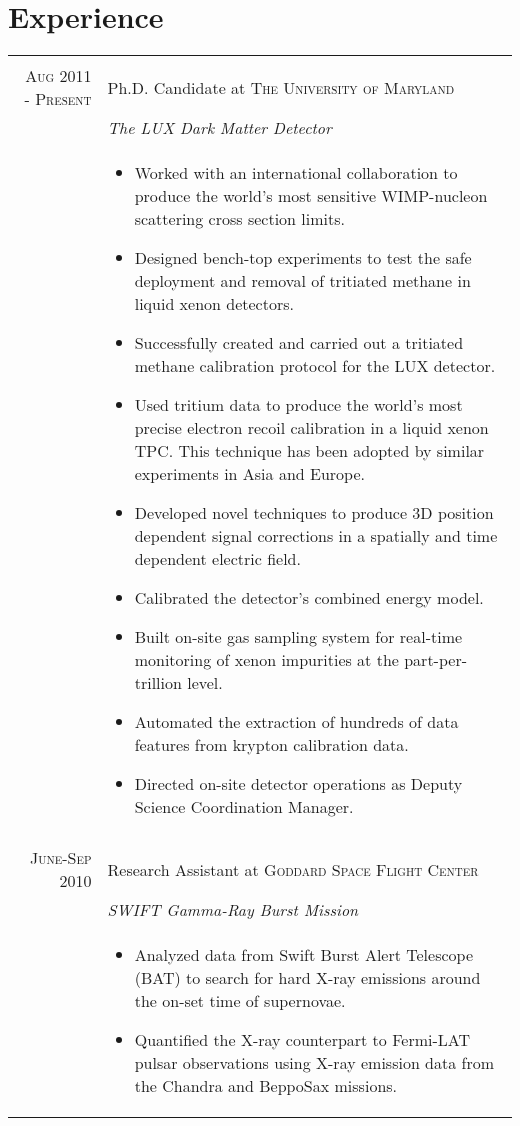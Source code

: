 \documentclass[a4paper,10pt]{article}
\begin{document}
\section{Experience}
\begin{tabular}{r|p{11cm}}
 \multicolumn{2}{c}{} \\
 \textsc{Aug 2011 - Present} & Ph.D. Candidate at \textsc{The University of Maryland} \\&\emph{The LUX Dark Matter Detector}\\&\footnotesize{
 \begin{itemize}
 
 \item Worked with an international collaboration to produce the world's most sensitive WIMP-nucleon scattering cross section limits.  
 
\item Designed bench-top experiments to test the safe deployment and removal of tritiated methane in liquid xenon detectors.  

\item Successfully created and carried out a tritiated methane calibration protocol for the LUX detector.  

\item Used tritium data to produce the world's most precise electron recoil calibration in a liquid xenon TPC.  This technique has been adopted by similar experiments in Asia and Europe. 

\item Developed novel techniques to produce 3D position dependent signal corrections in a spatially and time dependent electric field.  

\item Calibrated the detector's combined energy model.

\item Built on-site gas sampling system for real-time monitoring of xenon impurities at the part-per-trillion level.

\item Automated the extraction of hundreds of data features from krypton calibration data.  

\item Directed on-site detector operations as Deputy Science Coordination Manager.
\end{itemize}
}\\ 

 \multicolumn{2}{c}{} \\
 \textsc{June-Sep 2010} & Research Assistant at \textsc{Goddard Space Flight Center} \\&\emph{SWIFT Gamma-Ray Burst Mission}\\&\footnotesize{
 \begin{itemize}
\item Analyzed data from Swift Burst Alert Telescope (BAT) to search for hard X-ray emissions around the on-set time of supernovae.
\item Quantified the X-ray counterpart to Fermi-LAT pulsar observations using X-ray emission data from the Chandra and BeppoSax missions.
\end{itemize}
 }\\
 \end{tabular}
\end{document}

